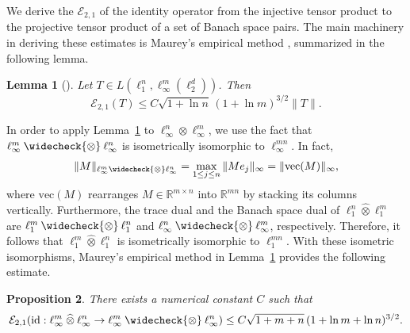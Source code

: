 \documentclass[11pt]{article}
\newtheorem{lemma}{Lemma}[section]
\newtheorem{prop}[lemma]{Proposition}
\begin{document}
We derive the $\mathcal{E}_{2,1}$ of the identity operator from the injective tensor product to the projective tensor product of a set of Banach space pairs. The main machinery in deriving these estimates is Maurey's empirical method \citep{carl1985inequalities}, summarized in the following lemma.

\begin{lemma}[{\cite[Lemma~3.4]{junge2020generalized}}]\label{mm}
Let $T \in L(\ell_1^n,\ell_\infty^m(\ell_2^d))$. Then
\[
\mathcal{E}_{2,1}(T) \leq C \sqrt{1+\ln n} \, (1+\ln m)^{3/2} \|T\|.
\]
\end{lemma}

In order to apply Lemma~\ref{mm} to $\ell_\infty^n \otimes \ell_\infty^m$, we use the fact that $\ell_\infty^m \mathbin{\widecheck{\otimes}} \ell_\infty^n$ is isometrically isomorphic to $\ell_\infty^{mn}$. In fact,
\[
\|M\|_{\ell_\infty^m \mathbin{\widecheck{\otimes}} \ell_\infty^n}
= \max_{1\leq j\leq n} \|M e_j\|_\infty = \|\mathrm{vec}(M)\|_\infty,
\]
where $\mathrm{vec}(M)$ rearranges $M \in \mathbb{R}^{m \times n}$ into $\mathbb{R}^{mn}$ by stacking its columns vertically. Furthermore, the trace dual and the Banach space dual of $\ell_1^n \mathbin{\widehat{\otimes}} \ell_1^m$ are $\ell_1^m \mathbin{\widecheck{\otimes}} \ell_1^n$ and $\ell_\infty^n \mathbin{\widecheck{\otimes}} \ell_\infty^m$, respectively. Therefore, it follows that $\ell_1^m \mathbin{\widehat{\otimes}} \ell_1^n$ is isometrically isomorphic to $\ell_1^{mn}$. 
With these isometric isomorphisms, Maurey's empirical method in Lemma~\ref{mm} provides the following estimate.

\begin{prop}
\label{prop:e21_pi2e_ellinfellinf}
There exists a numerical constant $C$ such that
\begin{align*}
\mathcal{E}_{2,1}(\mathrm{id}: \ell_\infty^m \mathbin{\widehat{\otimes}} \ell_\infty^n \to \ell_\infty^m \mathbin{\widecheck{\otimes}} \ell_\infty^n) 
\leq C \sqrt{1+m+n} \, (1+\ln m + \ln n)^{3/2}.
\end{align*}
\end{prop}
\end{document}
